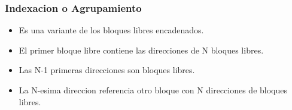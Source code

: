 \documentclass[12pt]{article}
\begin{document}
\subsubsection{Indexacion o Agrupamiento}
\begin{itemize}
    \item Es una variante de los bloques libres encadenados.
    \item El primer bloque libre contiene las direcciones de N bloques libres.
    \item Las N-1 primeras direcciones son bloques libres.
    \item La N-esima direccion referencia otro bloque con N direcciones de bloques libres.
\end{itemize}
\end{document}
